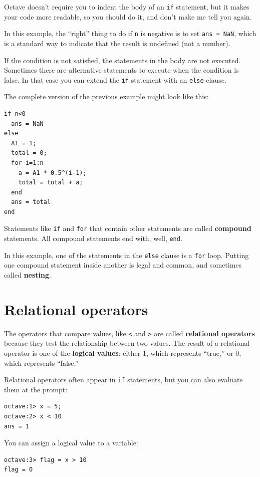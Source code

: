 \documentclass{book}
\begin{document}
Octave doesn't require you to indent the body of an {\tt if}
statement, but it makes your code more readable, so you should do it,
and don't make me tell you again.

In this example, the ``right'' thing to do if {\tt n} is negative
is to set {\tt ans = NaN}, which is a standard way to indicate that
the result is undefined (not a number).

If the condition is not satisfied, the statements in the body are
not executed. Sometimes there are alternative statements to
execute when the condition is false. In that case you can extend
the {\tt if} statement with an {\tt else} clause.

The complete version of the previous example might look like this:

\begin{verbatim}
if n<0
  ans = NaN
else
  A1 = 1;
  total = 0;
  for i=1:n
    a = A1 * 0.5^(i-1);
    total = total + a;
  end
  ans = total
end
\end{verbatim}

Statements like {\tt if} and {\tt for} that contain other statements
are called {\bf compound} statements. All compound statements end
with, well, {\tt end}.

In this example, one of the statements in the {\tt else} clause is a
{\tt for} loop. Putting one compound statement inside another is
legal and common, and sometimes called {\bf nesting}.


\section{Relational operators}

The operators that compare values, like {\tt <} and {\tt >} are
called {\bf relational operators} because they test the relationship
between two values. The result of a relational operator is one
of the {\bf logical values}:
either 1, which represents ``true,'' or 0, which represents ``false.''

Relational operators often appear in {\tt if} statements, but you
can also evaluate them at the prompt:

\begin{verbatim}
octave:1> x = 5;
octave:2> x < 10
ans = 1
\end{verbatim}

You can assign a logical value to a variable:

\begin{verbatim}
octave:3> flag = x > 10
flag = 0
\end{verbatim}
\end{document}
